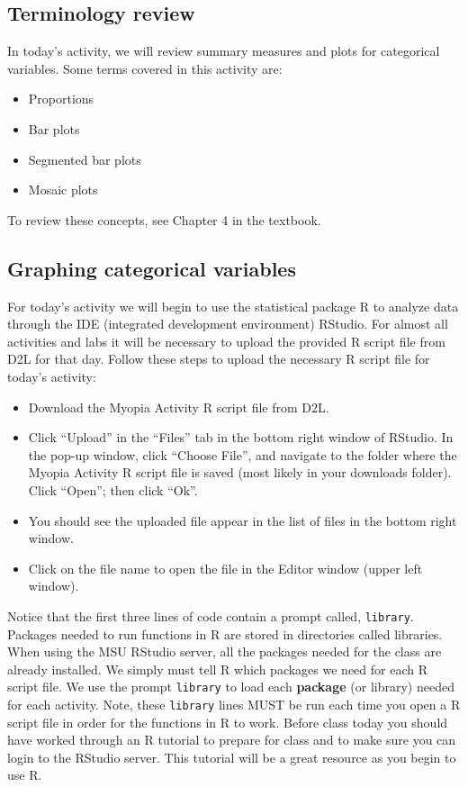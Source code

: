 \documentclass[
]{report}
\providecommand{\tightlist}{%
  \setlength{\itemsep}{0pt}\setlength{\parskip}{0pt}}
\begin{document}
\hypertarget{terminology-review-4}{%
\subsection{Terminology review}\label{terminology-review-4}}

In today's activity, we will review summary measures and plots for categorical variables. Some terms covered in this activity are:

\begin{itemize}
\item
  Proportions
\item
  Bar plots
\item
  Segmented bar plots
\item
  Mosaic plots
\end{itemize}

To review these concepts, see Chapter 4 in the textbook.

\hypertarget{graphing-categorical-variables}{%
\subsection{Graphing categorical variables}\label{graphing-categorical-variables}}

For today's activity we will begin to use the statistical package R to analyze data through the IDE (integrated development environment) RStudio. For almost all activities and labs it will be necessary to upload the provided R script file from D2L for that day. Follow these steps to upload the necessary R script file for today's activity:

\begin{itemize}
\tightlist
\item
  Download the Myopia Activity R script file from D2L.
\item
  Click ``Upload'' in the ``Files'' tab in the bottom right window of RStudio. In the pop-up window, click ``Choose File'', and navigate to the folder where the Myopia Activity R script file is saved (most likely in your downloads folder). Click ``Open''; then click ``Ok''.
\item
  You should see the uploaded file appear in the list of files in the bottom right window.
\item
  Click on the file name to open the file in the Editor window (upper left window).
\end{itemize}

Notice that the first three lines of code contain a prompt called, \texttt{library}. Packages needed to run functions in R are stored in directories called libraries. When using the MSU RStudio server, all the packages needed for the class are already installed. We simply must tell R which packages we need for each R script file. We use the prompt \texttt{library} to load each \textbf{package} (or library) needed for each activity. Note, these \texttt{library} lines MUST be run each time you open a R script file in order for the functions in R to work. Before class today you should have worked through an R tutorial to prepare for class and to make sure you can login to the RStudio server. This tutorial will be a great resource as you begin to use R.
\end{document}
